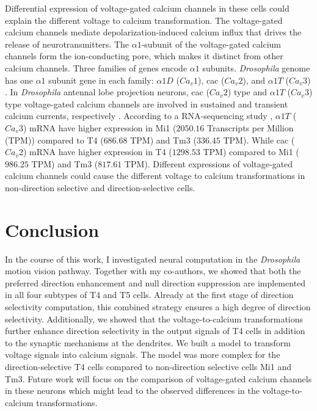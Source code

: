 Differential expression of voltage-gated calcium channels in these cells could explain the different voltage to calcium transformation. The voltage-gated calcium channels mediate depolarization-induced calcium influx that drives the release of neurotransmitters. The $\alpha1$-subunit of the voltage-gated calcium channels form the ion-conducting pore, which makes it distinct from other calcium channels. Three families of genes encode $\alpha1$ subunits. \textit{Drosophila} genome has one $\alpha1$ subunit gene in each family: $\alpha1D$ ($Ca_{v}1$), cac ($Ca_{v}2$), and $\alpha1T$ ($Ca_{v}3$) \parencite{Littleton2000, King2007}. In \textit{Drosophila} antennal lobe projection neurons, cac ($Ca_{v}2$) type and $\alpha1T$ ($Ca_{v}3$) type voltage-gated calcium channels are involved in sustained and transient calcium currents, respectively \parencite{Gu2009, Iniguez2013}. According to a RNA-sequencing study \parencite{Davis2020}, $\alpha1T$ ($Ca_{v}3$) mRNA have higher expression in Mi1 ($2050.16$ Transcripts per Million (TPM)) compared to T4 ($686.68$ TPM) and Tm3 ($336.45$ TPM). While cac ($Ca_{v}2$) mRNA have higher expression in T4 ($1298.53$ TPM) compared to Mi1 ($986.25$ TPM) and Tm3 ($817.61$ TPM). Different expressions of voltage-gated calcium channels could cause the different voltage to calcium transformations in non-direction selective and direction-selective cells.




\section{Conclusion}
In the course of this work, I investigated neural computation in the \textit{Drosophila} motion vision pathway. Together with my co-authors, we showed that both the preferred direction enhancement and null direction suppression are implemented in all four subtypes of T4 and T5 cells. Already at the first stage of direction selectivity computation, this combined strategy ensures a high degree of direction selectivity. Additionally, we showed that the voltage-to-calcium transformations further enhance direction selectivity in the output signals of T4 cells in addition to the synaptic mechanisms at the dendrites. We built a model to transform voltage signals into calcium signals. The model was more complex for the direction-selective T4 cells compared to non-direction selective cells Mi1 and Tm3. Future work will focus on the comparison of voltage-gated calcium channels in these neurons which might lead to the observed differences in the voltage-to-calcium transformations.



